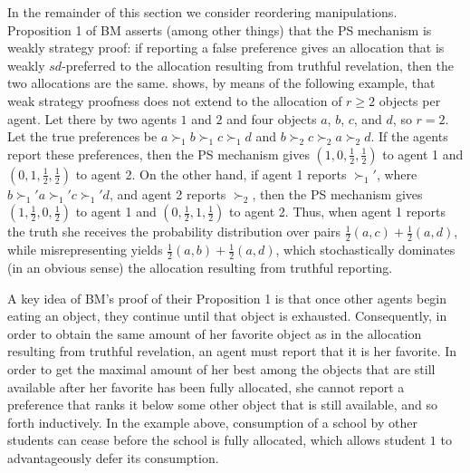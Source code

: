 \documentclass[12pt]{article}
\theoremstyle{definition}
\begin{document}
In the remainder of this section we consider reordering manipulations.  Proposition 1 of BM asserts (among other things) that the PS mechanism is weakly strategy proof: if reporting a false preference gives an allocation that is weakly  $sd$-preferred to the allocation resulting from truthful revelation, then the two allocations are the same. \cite{kojima09mss} shows, by means of the following example, that weak strategy proofness does not extend to the allocation of $r \ge 2$ objects per agent.  Let there by two agents $1$ and $2$ and four objects $a$, $b$, $c$, and $d$, so $r = 2$.  Let the true preferences be $a \succ_1 b \succ_1 c \succ_1 d$ and $b \succ_2 c \succ_2 a \succ_2 d$.  If the agents report these preferences, then the PS mechanism gives $(1,0,\tfrac12,\tfrac12)$ to agent 1 and $(0,1,\tfrac12,\tfrac12)$ to agent 2.  On the other hand, if agent 1 reports $\succ_1'$, where $b \succ_1' a \succ_1' c \succ_1' d$, and agent 2 reports $\succ_2$, then  the PS mechanism gives $(1,\tfrac12,0,\tfrac12)$ to agent 1 and $(0,\tfrac12,1,\tfrac12)$ to agent 2.  Thus, when agent 1 reports the truth she receives the probability distribution  over pairs $\tfrac12 (a,c) + \tfrac12 (a,d)$, while misrepresenting yields $\tfrac12 (a,b) + \tfrac12 (a,d)$, which stochastically dominates (in an obvious sense) the allocation resulting from truthful reporting. 

A key idea of BM's proof of their Proposition 1 is that once other agents begin eating an object, they continue until that object is exhausted.  Consequently, in order to obtain the same amount of her favorite object as in the allocation resulting from truthful revelation, an agent must report that it is her favorite.  In order to get the maximal amount of her best among the objects that are still available after her favorite has been fully allocated, she cannot report a preference that ranks it below some other object that is still available, and so forth inductively.  In the example above, consumption of a school by other students can cease before the school is fully allocated, which allows student $1$ to advantageously defer its consumption.
\end{document}
